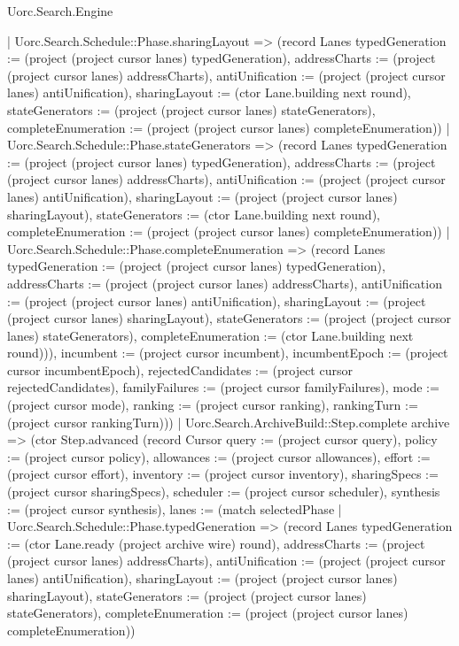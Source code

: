 \begin{lexlean}{Uorc.Search.Engine}
\begin{semanticmodule}
{{        | Uorc.Search.Schedule::Phase.sharingLayout => (record Lanes {typedGeneration := (project (project cursor lanes) typedGeneration), addressCharts := (project (project cursor lanes) addressCharts), antiUnification := (project (project cursor lanes) antiUnification), sharingLayout := (ctor Lane.building next round), stateGenerators := (project (project cursor lanes) stateGenerators), completeEnumeration := (project (project cursor lanes) completeEnumeration)})
        | Uorc.Search.Schedule::Phase.stateGenerators => (record Lanes {typedGeneration := (project (project cursor lanes) typedGeneration), addressCharts := (project (project cursor lanes) addressCharts), antiUnification := (project (project cursor lanes) antiUnification), sharingLayout := (project (project cursor lanes) sharingLayout), stateGenerators := (ctor Lane.building next round), completeEnumeration := (project (project cursor lanes) completeEnumeration)})
        | Uorc.Search.Schedule::Phase.completeEnumeration => (record Lanes {typedGeneration := (project (project cursor lanes) typedGeneration), addressCharts := (project (project cursor lanes) addressCharts), antiUnification := (project (project cursor lanes) antiUnification), sharingLayout := (project (project cursor lanes) sharingLayout), stateGenerators := (project (project cursor lanes) stateGenerators), completeEnumeration := (ctor Lane.building next round)})), incumbent := (project cursor incumbent), incumbentEpoch := (project cursor incumbentEpoch), rejectedCandidates := (project cursor rejectedCandidates), familyFailures := (project cursor familyFailures), mode := (project cursor mode), ranking := (project cursor ranking), rankingTurn := (project cursor rankingTurn)}))
      | Uorc.Search.ArchiveBuild::Step.complete archive => (ctor Step.advanced (record Cursor {query := (project cursor query), policy := (project cursor policy), allowances := (project cursor allowances), effort := (project cursor effort), inventory := (project cursor inventory), sharingSpecs := (project cursor sharingSpecs), scheduler := (project cursor scheduler), synthesis := (project cursor synthesis), lanes := (match selectedPhase
        | Uorc.Search.Schedule::Phase.typedGeneration => (record Lanes {typedGeneration := (ctor Lane.ready (project archive wire) round), addressCharts := (project (project cursor lanes) addressCharts), antiUnification := (project (project cursor lanes) antiUnification), sharingLayout := (project (project cursor lanes) sharingLayout), stateGenerators := (project (project cursor lanes) stateGenerators), completeEnumeration := (project (project cursor lanes) completeEnumeration)})
}}
\end{semanticmodule}
\end{lexlean}
